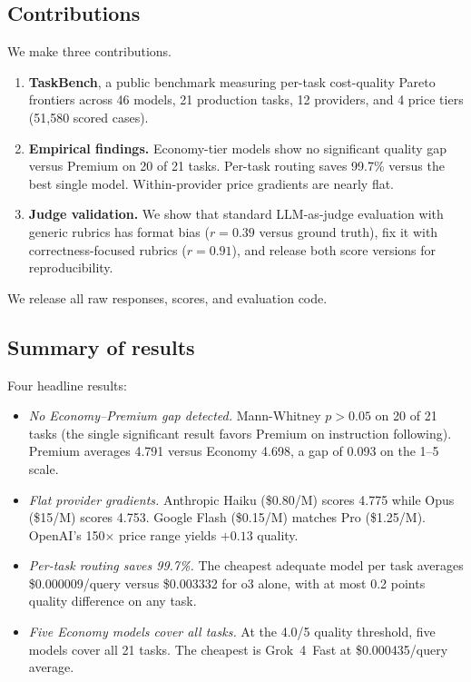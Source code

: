 \documentclass[11pt]{article}
\begin{document}
\subsection{Contributions}

We make three contributions.

\begin{enumerate}[leftmargin=*,itemsep=2pt]
\item \textbf{TaskBench}, a public benchmark measuring per-task
  cost-quality Pareto frontiers across 46 models, 21 production tasks,
  12 providers, and 4 price tiers (51,580 scored cases).
\item \textbf{Empirical findings.}  Economy-tier models show no
  significant quality gap versus Premium on 20 of 21 tasks.  Per-task routing
  saves 99.7\% versus the best single model.  Within-provider price
  gradients are nearly flat.
\item \textbf{Judge validation.}  We show that standard LLM-as-judge
  evaluation with generic rubrics has format bias ($r = 0.39$ versus
  ground truth), fix it with correctness-focused rubrics ($r = 0.91$),
  and release both score versions for reproducibility.
\end{enumerate}

We release all raw responses, scores, and evaluation code.

\subsection{Summary of results}

Four headline results:

\begin{itemize}[leftmargin=*,itemsep=2pt]
\item \textit{No Economy--Premium gap detected.}  Mann-Whitney $p > 0.05$
  on 20 of 21 tasks (the single significant result favors Premium on
  instruction following).
  Premium averages 4.791 versus Economy 4.698, a gap of 0.093 on the
  1--5 scale.
\item \textit{Flat provider gradients.}  Anthropic Haiku (\$0.80/M)
  scores 4.775 while Opus (\$15/M) scores 4.753.  Google Flash
  (\$0.15/M) matches Pro (\$1.25/M).  OpenAI's 150$\times$ price range
  yields $+0.13$ quality.
\item \textit{Per-task routing saves 99.7\%.}  The cheapest adequate
  model per task averages \$0.000009/query versus \$0.003332 for o3
  alone, with at most 0.2 points quality difference on any task.
\item \textit{Five Economy models cover all tasks.}  At the 4.0/5
  quality threshold, five models cover all 21 tasks.  The cheapest is
  Grok~4~Fast at \$0.000435/query average.
\end{itemize}
\end{document}
